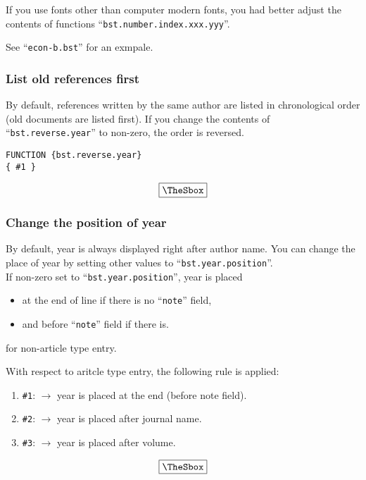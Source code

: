 \documentclass[10pt]{article}
\newenvironment{Frame}%
{\setlength{\fboxsep}{15pt}
\setlength{\mylength}{\linewidth}%
\addtolength{\mylength}{-2\fboxsep}%
\addtolength{\mylength}{-2\fboxrule}%
\Sbox
\minipage{\mylength}%
\setlength{\abovedisplayskip}{0pt}%
\setlength{\belowdisplayskip}{0pt}%
}%
{\endminipage\endSbox
\[\fbox{\TheSbox}\]}
\begin{document}
If you use fonts other than computer modern fonts, you had better adjust
the contents of functions ``\texttt{bst.number.index.xxx.yyy}''.

See ``\texttt{econ-b.bst}'' for an exmpale.


\subsubsection{List old references first}

By default, references written by the same author are listed in
chronological order (old documents are listed first).  If you change the
contents of ``\texttt{bst.reverse.year}'' to non-zero, the order is
reversed.
\begin{Frame}
\begin{verbatim}
FUNCTION {bst.reverse.year}
{ #1 }
\end{verbatim}
\end{Frame}

\subsubsection{Change the position of year}

By default, year is always displayed right after author name.  You can
change the place of year by setting other values to
``\texttt{bst.year.position}''.
\\

If non-zero set to ``\texttt{bst.year.position}'', year is placed
\begin{itemize}
 \item at the end of line if there is no ``\texttt{note}'' field, 
 \item and before ``\texttt{note}'' field if there is.
\end{itemize}
for non-article type entry.

With respect to aritcle type entry, the following rule is applied:
\begin{Frame}
\begin{enumerate}
 \item \verb|#1|: $\rightarrow$ year is placed at the end (before note field).
 \item \verb|#2|: $\rightarrow$ year is placed after journal name.
 \item \verb|#3|: $\rightarrow$ year is placed after volume.
\end{enumerate}
\end{Frame}
\end{document}
